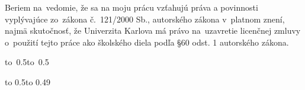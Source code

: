 \medskip\noindent
Beriem na~vedomie, že sa na moju prácu vzťahujú práva a povinnosti vyplývajúce
zo~zákona č.~121/2000 Sb., autorského zákona v~platnom znení, najmä skutočnosť,
že Univerzita Karlova má právo na~uzavretie licenčnej zmluvy o~použití tejto
práce ako školského diela podľa §60 odst. 1 autorského zákona.


\vspace{10mm}

\hbox{\hbox to 0.5\hbox to 0.5}

\vspace{20mm}
\newpage


\openright

\noindent
\Podekovani

\newpage


\openright

\vbox to 0.5\nobreak\vbox to 0.49

\newpage

\openright
\pagestyle{plain}
\setcounter{page}{1}
